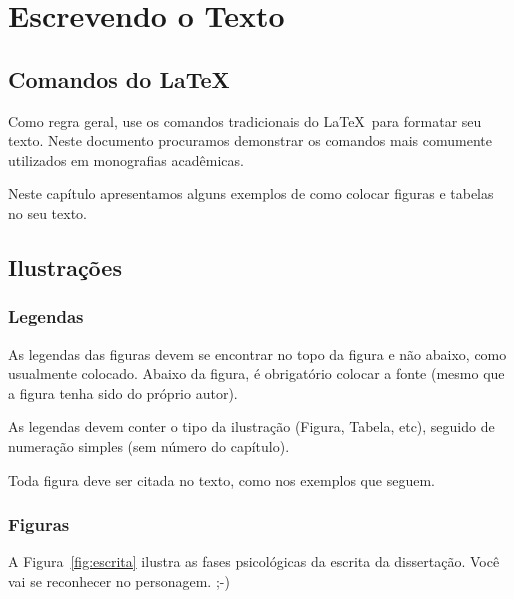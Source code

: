 \documentclass[twoside,english,brazilian]{UNISINOSmonografia}
\begin{document}
\chapter{Escrevendo o Texto}

\section{Comandos do \LaTeX}
Como regra geral, use os comandos tradicionais do \LaTeX\ para formatar seu texto.  Neste documento procuramos demonstrar os comandos mais comumente utilizados em monografias acadêmicas.

Neste capítulo apresentamos alguns exemplos de como colocar figuras e tabelas no seu texto.

\section{Ilustrações}

\subsection{Legendas}
As legendas das figuras devem se encontrar no topo da figura e não abaixo, como usualmente colocado. Abaixo da figura, é obrigatório colocar a fonte (mesmo que a figura tenha sido do próprio autor).

As legendas devem conter o tipo da ilustração (Figura, Tabela, etc), seguido de numeração simples (sem número do capítulo).

Toda figura deve ser citada no texto, como nos exemplos que seguem.

\subsection{Figuras}
A Figura~\ref{fig:escrita} ilustra as fases psicológicas da escrita da dissertação. Você vai se reconhecer no personagem. ;-)
\end{document}
